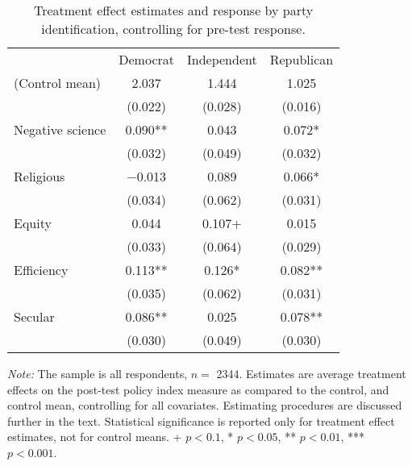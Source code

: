 \begin{table*}

\caption{\label{tab:unnamed-chunk-19}Treatment effect estimates and response by party identification, controlling for pre-test response.\label{tab:party_lin_all}}
\centering
\begin{threeparttable}
\begin{tabular}[t]{lccc}
\toprule
  & Democrat & Independent & Republican\\
\cmidrule(lr){2-2} \cmidrule(lr){3-3} \cmidrule(lr){4-4}
(Control mean) & \num{2.037} & \num{1.444} & \num{1.025}\\
 & (\num{0.022}) & (\num{0.028}) & (\num{0.016})\\
Negative science & \num{0.090}** & \num{0.043} & \num{0.072}*\\
 & (\num{0.032}) & (\num{0.049}) & (\num{0.032})\\
Religious & \num{-0.013} & \num{0.089} & \num{0.066}*\\
 & (\num{0.034}) & (\num{0.062}) & (\num{0.031})\\
Equity & \num{0.044} & \num{0.107}+ & \num{0.015}\\
 & (\num{0.033}) & (\num{0.064}) & (\num{0.029})\\
Efficiency & \num{0.113}** & \num{0.126}* & \num{0.082}**\\
 & (\num{0.035}) & (\num{0.062}) & (\num{0.031})\\
Secular & \num{0.086}** & \num{0.025} & \num{0.078}**\\
 & (\num{0.030}) & (\num{0.049}) & (\num{0.030})\\
\bottomrule
\end{tabular}
\begin{tablenotes}
\item \footnotesize \textit{Note:} The sample is all respondents, $n = $ \num{2344}. Estimates are average treatment effects on the post-test policy index measure as compared to the control, and control mean, controlling for all covariates. Estimating procedures are discussed further in the text. Statistical significance is reported only for treatment effect estimates, not for control means. + $p < 0.1$, * $p < 0.05$, ** $p < 0.01$, *** $p < 0.001$.
\end{tablenotes}
\end{threeparttable}
\end{table*}
